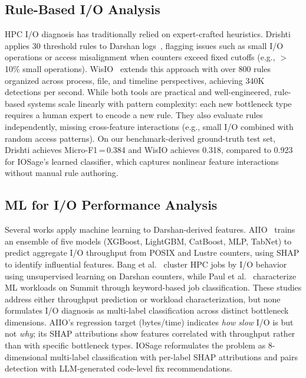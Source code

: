 
\subsection{Rule-Based I/O Analysis}
HPC I/O diagnosis has traditionally relied on expert-crafted heuristics.
Drishti~\cite{bez2022drishti} applies 30 threshold rules to Darshan logs~\cite{snyder2016darshan},
flagging issues such as small I/O operations or access misalignment when
counters exceed fixed cutoffs (e.g., $>$10\% small operations).
WisIO~\cite{devarajan2025wisio} extends this approach with over 800 rules
organized across process, file, and timeline perspectives, achieving
340K detections per second.
While both tools are practical and well-engineered, rule-based systems
scale linearly with pattern complexity: each new bottleneck type requires
a human expert to encode a new rule.
They also evaluate rules independently, missing cross-feature interactions
(e.g., small I/O combined with random access patterns).
On our benchmark-derived ground-truth test set, Drishti achieves
Micro-F1\,=\,0.384 and WisIO achieves 0.318, compared to 0.923 for IOSage's
learned classifier, which captures nonlinear feature interactions
without manual rule authoring.

\subsection{ML for I/O Performance Analysis}
Several works apply machine learning to Darshan-derived features.
AIIO~\cite{dong2023aiio} trains an ensemble of five models (XGBoost,
LightGBM, CatBoost, MLP, TabNet) to predict aggregate I/O throughput from
POSIX and Lustre counters, using SHAP to identify influential features.
Bang et al.~\cite{bang2020clustering} cluster HPC jobs by I/O behavior using
unsupervised learning on Darshan counters, while
Paul et al.~\cite{paul2022characterizing} characterize ML workloads on Summit
through keyword-based job classification.
These studies address either throughput prediction or workload characterization,
but none formulates I/O diagnosis as multi-label classification
across distinct bottleneck dimensions.
AIIO's regression target (bytes/time) indicates \emph{how slow} I/O is
but not \emph{why}; its SHAP attributions show features correlated with
throughput rather than with specific bottleneck types.
IOSage reformulates the problem as 8-dimensional multi-label classification
with per-label SHAP attributions and pairs detection with
LLM-generated code-level fix recommendations.

